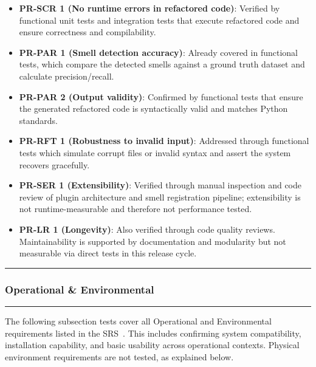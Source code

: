 \documentclass[12pt, titlepage]{article}
\newcommand{\colorrule}{\textcolor{BlueViolet}{\rule{\linewidth}{2pt}}}
\begin{document}
\begin{itemize}
  \item \textbf{PR-SCR 1 (No runtime errors in refactored code)}: Verified by functional unit tests and integration tests that execute refactored code and ensure correctness and compilability.
  
  \item \textbf{PR-PAR 1 (Smell detection accuracy)}: Already covered in functional tests, which compare the detected smells against a ground truth dataset and calculate precision/recall.

  \item \textbf{PR-PAR 2 (Output validity)}: Confirmed by functional tests that ensure the generated refactored code is syntactically valid and matches Python standards.

  \item \textbf{PR-RFT 1 (Robustness to invalid input)}: Addressed through functional tests which simulate corrupt files or invalid syntax and assert the system recovers gracefully.

  \item \textbf{PR-SER 1 (Extensibility)}: Verified through manual inspection and code review of plugin architecture and smell registration pipeline; extensibility is not runtime-measurable and therefore not performance tested.

  \item \textbf{PR-LR 1 (Longevity)}: Also verified through code quality reviews. Maintainability is supported by documentation and modularity but not measurable via direct tests in this release cycle.
\end{itemize}


  \noindent
  \colorrule

\subsubsection{Operational \& Environmental}
\colorrule

\medskip

\noindent
The following subsection tests cover all Operational and Environmental requirements listed in the SRS~\cite{SRS}. This includes confirming system compatibility, installation capability, and basic usability across operational contexts. Physical environment requirements are not tested, as explained below.
\end{document}

